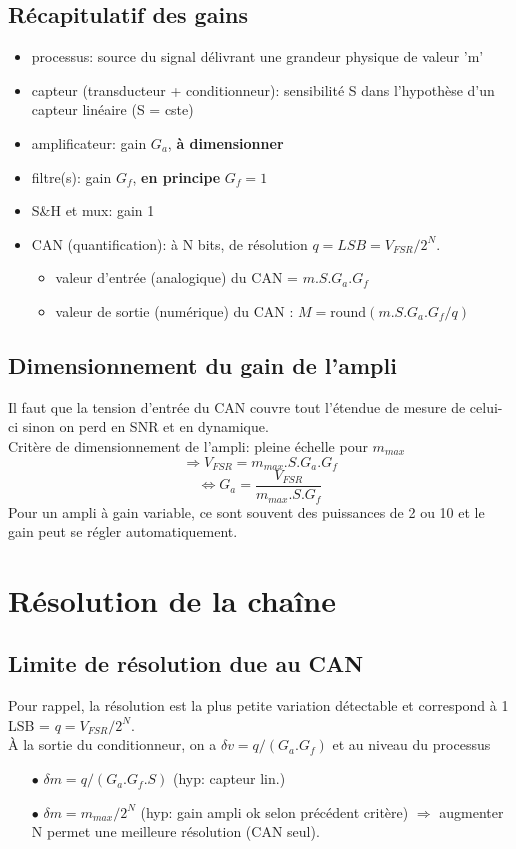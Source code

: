 \subsection{Récapitulatif des gains}
\begin{itemize}
	\item processus: source du signal délivrant une grandeur physique de valeur 'm'
	\item capteur (transducteur + conditionneur): sensibilité S dans l'hypothèse d'un capteur linéaire (S = cste)
	\item amplificateur: gain \(G_a\), \textbf{à dimensionner}
	\item filtre(s): gain \(G_f\), \textbf{en principe} \(G_f = 1\)
	\item S\&H et mux: gain 1
	\item CAN (quantification): à N bits, de résolution \(q=LSB=V_{FSR}/2^N\).
	\begin{itemize}
		\item valeur d'entrée (analogique) du CAN = \(m.S.G_a.G_f\)
		\item valeur de sortie (numérique) du CAN : \(M=\text{round}(m.S.G_a.G_f/q)\)
	\end{itemize}
\end{itemize}
\subsection{Dimensionnement du gain de l'ampli}
Il faut que la tension d'entrée du CAN couvre tout l'étendue de mesure de celui-ci sinon on perd en SNR et en dynamique.\\

Critère de dimensionnement de l'ampli: pleine échelle pour \(m_{max}\)
\[\Rightarrow V_{FSR} = m_{max}.S.G_a.G_f\]
\[\Leftrightarrow G_a=\frac{V_{FSR}}{m_{max}.S.G_f}\]
Pour un ampli à gain variable, ce sont souvent des puissances de 2 ou 10 et le gain peut se régler automatiquement.
\section{Résolution de la chaîne}
\subsection{Limite de résolution due au CAN}
Pour rappel, la résolution est la plus petite variation détectable et correspond à 1 LSB = \(q = V_{FSR}/2^N\).\\
À la sortie du conditionneur, on a \(\delta v=q/(G_a.G_f)\) et au niveau du processus \begin{itemize}
	\item[\(\bullet\)] \(\delta m = q/(G_a.G_f.S)\) (hyp: capteur lin.)
	\item[\(\bullet\)] \(\delta m = m_{max}/2^N\) (hyp: gain ampli ok selon précédent critère) \(\Rightarrow\) augmenter N permet une meilleure résolution (CAN seul).
\end{itemize}
